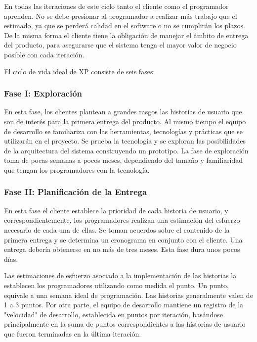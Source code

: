 En todas las iteraciones de este ciclo tanto el cliente como el programador aprenden. No se debe presionar al programador a realizar más trabajo que el estimado, ya que se perderá calidad en el software o no se cumplirán los plazos. De la misma forma el cliente tiene la obligación de manejar el ámbito de entrega del producto, para asegurarse que el sistema tenga el mayor valor de negocio posible con cada iteración.

El ciclo de vida ideal de XP consiste de seis fases: %
\setlength{\parskip}{0mm}

\subsubsection{Fase I: Exploración}	
\setlength{\parskip}{5mm}

	En esta fase, los clientes plantean a grandes rasgos las historias de usuario que son de interés para la primera entrega del producto. Al mismo tiempo el equipo de desarrollo se familiariza con las herramientas, tecnologías y prácticas que se utilizarán en el proyecto. Se prueba la tecnología y se exploran las posibilidades de la arquitectura del sistema construyendo un prototipo. La fase de exploración toma de pocas semanas a pocos meses, dependiendo del tamaño y familiaridad que tengan los programadores con la tecnología.

\setlength{\parskip}{0mm}

\subsubsection{Fase II: Planificación de la Entrega}
\setlength{\parskip}{5mm}

	En esta fase el cliente establece la prioridad de cada historia de usuario, y correspondientemente, los programadores realizan una estimación del esfuerzo necesario de cada una de ellas. Se toman acuerdos sobre el contenido de la primera entrega y se determina un cronograma en conjunto con el cliente. Una entrega debería obtenerse en no más de tres meses. Esta fase dura unos pocos días.

	Las estimaciones de esfuerzo asociado a la implementación de las historias la establecen los programadores utilizando como medida el punto. Un punto, equivale a una semana ideal de programación. Las historias generalmente valen de 1 a 3 puntos. Por otra parte, el equipo de desarrollo mantiene un registro de la "velocidad" de desarrollo, establecida en puntos por iteración, basándose principalmente en la suma de puntos correspondientes a las historias de usuario que fueron terminadas en la última iteración.

